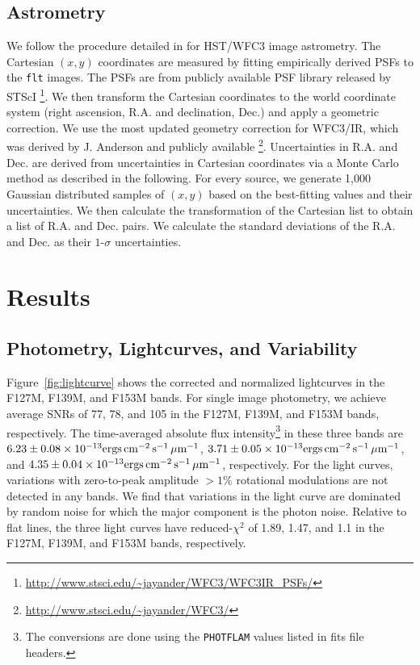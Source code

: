 \documentclass[twocolumn]{aastex62}
\newcommand{\fluxunit}{\ensuremath{\mathrm{ergs}\,\mathrm{cm^{-2}}\,\mathrm{s^{-1}}\,\mathrm{\micron^{{-1}}}}}
\begin{document}
\subsection{Astrometry}
We follow the procedure detailed in \citet{Bedin2018} for HST/WFC3 image astrometry.
The Cartesian $(x, y)$ coordinates are measured by fitting empirically derived PSFs to the \texttt{flt} images. The PSFs are from publicly available PSF library released by STScI \footnote{\url{http://www.stsci.edu/~jayander/WFC3/WFC3IR\_PSFs/}}. We then transform the Cartesian coordinates to the world coordinate system (right ascension, {R.A.} and declination, {Dec.}) and apply a geometric correction. We use the most updated geometry correction for WFC3/IR, which was derived by J. Anderson and publicly available \footnote{\url{http://www.stsci.edu/~jayander/WFC3/}}.  Uncertainties in {R.A.} and {Dec.} are derived from uncertainties in Cartesian coordinates via a Monte Carlo method as described in the following. For every source, we generate 1,000 Gaussian distributed samples of $(x, y)$  based on the best-fitting values and their uncertainties. We then calculate the transformation of the Cartesian list  to obtain a list of {R.A.} and {Dec.} pairs. We calculate the standard deviations of the {R.A.} and {Dec.} as their $1$-$\sigma$ uncertainties.

\section{Results}
\subsection{Photometry, Lightcurves, and Variability}

Figure~\ref{fig:lightcurve} shows the corrected and normalized lightcurves in the F127M, F139M, and F153M bands. For single image photometry, we achieve average SNRs of  77, 78, and 105 in the F127M, F139M, and F153M bands, respectively. The time-averaged absolute flux intensity\footnote{The conversions are done using the \texttt{PHOTFLAM} values listed in fits file headers.} in these three bands are $6.23\pm0.08\times10^{-13}\fluxunit$, $3.71\pm0.05\times10^{-13}\fluxunit$, and $4.35\pm0.04\times10^{{-13}}\fluxunit$, respectively.
For the light curves, variations with zero-to-peak amplitude $>1\%$ rotational modulations are not detected in any bands. We find that variations in the light curve are dominated by random noise for which the major component is the photon noise. Relative to flat lines, the three light curves have reduced-$\chi^{2}$ of 1.89, 1.47, and 1.1 in the F127M, F139M, and F153M bands, respectively.
\end{document}
